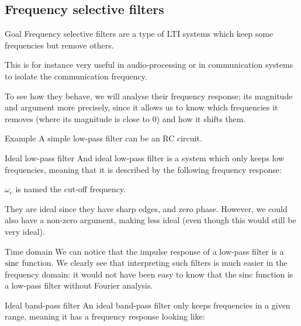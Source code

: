 \documentclass[a4paper]{article}
\begin{document}
\subsection{Frequency selective filters}
\begin{parag}{Goal}
    Frequency selective filters are a type of LTI systems which keep some frequencies but remove others.

    This is for instance very useful in audio-processing or in communication systems to isolate the communication frequency.

    To see how they behave, we will analyse their frequency response; its magnitude and argument more precisely, since it allows us to know which frequencies it removes (where its magnitude is close to 0) and how it shifts them.

    \begin{subparag}{Example}
        A simple low-pass filter can be an RC circuit. 
    \end{subparag}
    
\end{parag}

\begin{parag}{Ideal low-pass filter}
    And ideal low-pass filter is a system which only keeps low frequencies, meaning that it is described by the following frequency response:

    $\omega_c$ is named the cut-off frequency.

    They are ideal since they have sharp edges, and zero phase. However, we could also have a non-zero argument, making less ideal (even though this would still be very ideal).

    \begin{subparag}{Time domain}
        We can notice that the impulse response of a low-pass filter is a $\operatorname{sinc}$ function. We clearly see that interpreting such filters is much easier in the frequency domain: it would not have been easy to know that the sinc function is a low-pass filter without Fourier analysis.
    \end{subparag}
\end{parag}

\begin{parag}{Ideal band-pass filter}
    An ideal band-pass filter only keeps frequencies in a given range, meaning it has a frequency response looking like:
\end{parag}
\end{document}
